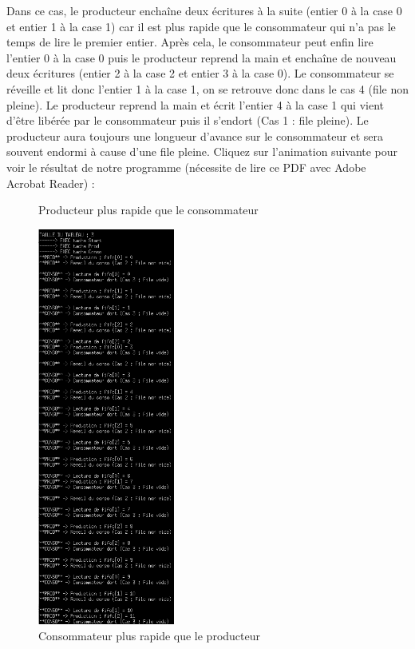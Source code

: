 \documentclass[a4paper,12pt]{report}
\begin{document}
Dans ce cas, le producteur enchaîne deux écritures à la suite (entier 0 à la case 0 et entier 1 à la case 1) car il est plus rapide que le consommateur qui n'a pas le temps de lire le premier entier. Après cela, le consommateur peut enfin lire l'entier 0 à la case 0 puis le producteur reprend la main et enchaîne de nouveau deux écritures (entier 2 à la case 2 et entier 3 à la case 0). Le consommateur se réveille et lit donc l'entier 1 à la case 1, on se retrouve donc dans le cas 4 (file non pleine). Le producteur reprend la main et écrit l'entier 4 à la case 1 qui vient d'être libérée par le consommateur puis il s'endort (Cas 1 : file pleine). Le producteur aura toujours une longueur d'avance sur le consommateur et sera souvent endormi à cause d'une file pleine. Cliquez sur l'animation suivante pour voir le résultat de notre programme (nécessite de lire ce PDF avec Adobe Acrobat Reader) :

\begin{figure}[h]
	  \centering
		\caption{Producteur plus rapide que le consommateur}
		\label{anim_conso_plus_rapide}
\end{figure}

\newpage

\begin{figure}[h]
	\centering
		\includegraphics[width=0.4\textwidth]{screens/conso_plus_rapide_sem.png}
		\caption{Consommateur plus rapide que le producteur}
		\label{conso_plus_rapide}
\end{figure}
\end{document}
